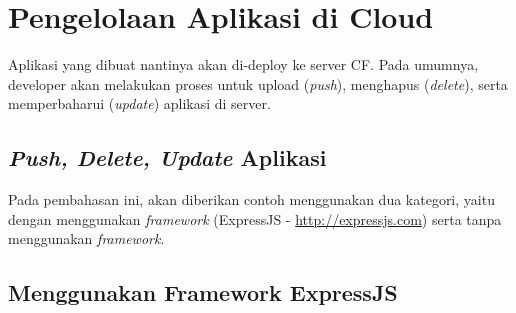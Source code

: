\section{Pengelolaan Aplikasi di Cloud}

Aplikasi yang dibuat nantinya akan di-deploy ke server CF. Pada umumnya, developer akan melakukan proses untuk upload (\textit{push}), menghapus (\textit{delete}), serta memperbaharui (\textit{update}) aplikasi di server.

\subsection{\textit{Push, Delete, Update} Aplikasi}

Pada pembahasan ini, akan diberikan contoh menggunakan dua kategori, yaitu dengan menggunakan \textit{framework} (ExpressJS - \url{http://expressjs.com}) serta tanpa menggunakan \textit{framework}.

\subsection{Menggunakan Framework ExpressJS}

